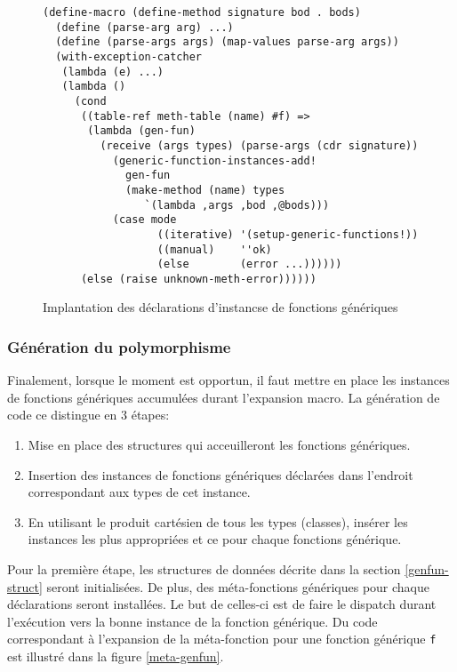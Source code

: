       \begin{figure}[h!]
        \begin{lstlisting}
(define-macro (define-method signature bod . bods)
  (define (parse-arg arg) ...)
  (define (parse-args args) (map-values parse-arg args))
  (with-exception-catcher
   (lambda (e) ...)
   (lambda ()
     (cond
      ((table-ref meth-table (name) #f) =>
       (lambda (gen-fun)
         (receive (args types) (parse-args (cdr signature))
           (generic-function-instances-add!
             gen-fun
             (make-method (name) types
                `(lambda ,args ,bod ,@bods)))
           (case mode
                  ((iterative) '(setup-generic-functions!))
                  ((manual)    ''ok)
                  (else        (error ...))))))
      (else (raise unknown-meth-error))))))
        \end{lstlisting}
        \caption{Implantation des déclarations d'instancse de
          fonctions génériques}
        \label{defmeth}
      \end{figure}

    \subsubsection{Génération du polymorphisme}
      Finalement, lorsque le moment est opportun, il faut mettre en
      place les instances de fonctions génériques accumulées durant
      l'expansion macro. La génération de code ce distingue en 3 étapes:

      \begin{enumerate}
      \item Mise en place des structures qui acceuilleront les
        fonctions génériques.
      \item Insertion des instances de fonctions génériques déclarées
        dans l'endroit correspondant aux types de cet instance.
      \item En utilisant le produit cartésien de tous les types
        (classes), insérer les instances les plus appropriées et ce
        pour chaque fonctions générique.
      \end{enumerate}

      Pour la première étape, les structures de données décrite dans
      la section \ref{genfun-struct} seront initialisées. De plus, des
      méta-fonctions génériques pour chaque déclarations seront
      installées. Le but de celles-ci est de faire le \og dispatch \fg
      durant l'exécution vers la bonne instance de la fonction
      générique. Du code correspondant à l'expansion de la
      méta-fonction pour une fonction générique \texttt{f} est
      illustré dans la figure \ref{meta-genfun}.
      
